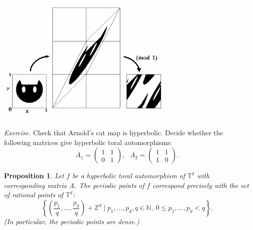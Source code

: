 \documentclass[12pt]{article}
\newtheorem{proposition}[theorem]{Proposition}
\theoremstyle{definition}
\theoremstyle{remark}
\begin{document}
{\centering
\includegraphics[width=0.65\textwidth]{catmap}
\par}

\noindent
{\it Exercise.}
Check that Arnold's cat map is hyperbolic.  Decide whether the
following matrices give hyperbolic toral automorphisms:
\[
 A_{1} = \left( \begin{array}{cc} 1 & 1 \\ 0 & 1 \end{array} \right),\
 \ \ 
 A_{2} = \left( \begin{array}{cc} 1 & 1 \\ 1 & 0 \end{array} \right).
\]

\medskip



\begin{proposition}
Let $f$ be a hyperbolic toral automorphism of  $\mathbb T^d$ with
corresponding matrix $A$.
The periodic points of $f$ correspond precisely with the set of
rational points of $\mathbb T^d$:
\[
 \left\{ \left( \frac{p_{1}}{q}, \ldots,\frac{p_{d}}{q} \right) + \mathbb Z^{d} \mid
 p_{1},\ldots,p_{d},q \in \mathbb N,\ 0 \leq p_{1},\ldots,p_{d} < q \right\}.
\]
(In particular, the periodic points are dense.)
\end{proposition}
\end{document}
